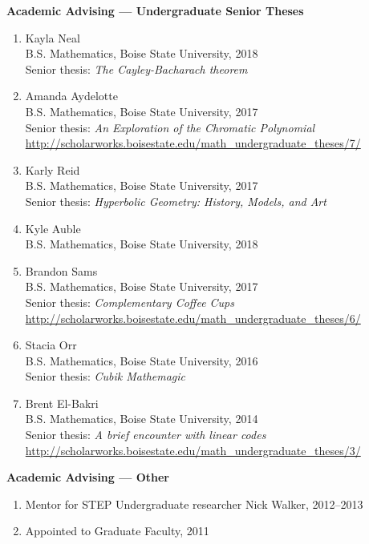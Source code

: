 \documentclass[12pt]{article}
\begin{document}
\textbf{Academic Advising --- Undergraduate Senior Theses}
\begin{enumerate}
\item Kayla Neal \\
B.S. Mathematics, Boise State University, 2018 \\
Senior thesis: \emph{The Cayley-Bacharach theorem}

\item Amanda Aydelotte \\
B.S. Mathematics, Boise State University, 2017 \\
Senior thesis: \emph{An Exploration of the Chromatic Polynomial} \\
\url{http://scholarworks.boisestate.edu/math_undergraduate_theses/7/}

\item Karly Reid \\
B.S. Mathematics, Boise State University, 2017 \\
Senior thesis: \emph{Hyperbolic Geometry: History, Models, and Art}

\item Kyle Auble \\
B.S. Mathematics, Boise State University, 2018

\item Brandon Sams \\
B.S. Mathematics, Boise State University, 2017 \\
Senior thesis: \emph{Complementary Coffee Cups} \\
\url{http://scholarworks.boisestate.edu/math_undergraduate_theses/6/}

\item Stacia Orr \\
B.S. Mathematics, Boise State University, 2016 \\
Senior thesis: \emph{Cubik Mathemagic}

\item Brent El-Bakri \\
B.S. Mathematics, Boise State University, 2014 \\
Senior thesis: \emph{A brief encounter with linear codes} \\
\url{http://scholarworks.boisestate.edu/math_undergraduate_theses/3/}
\end{enumerate}



\textbf{Academic Advising --- Other}
\begin{enumerate}
\item Mentor for STEP Undergraduate researcher Nick Walker, 2012--2013

\item Appointed to Graduate Faculty, 2011
\end{enumerate}
\end{document}

